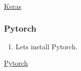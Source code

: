 \documentclass[12pt]{article}
\begin{document}
\begin{center}
\href{run:./Text_Files_16/Keras.txt}{\Large Keras}
\end{center}

\subsubsection{Pytorch}

\begin{enumerate}[resume]
  \item Lets install Pytorch.
\end{enumerate}

\begin{center}
\href{run:./Text_Files_16/Pytorch.txt}{\Large Pytorch}
\end{center}





%
%
\end{document}
